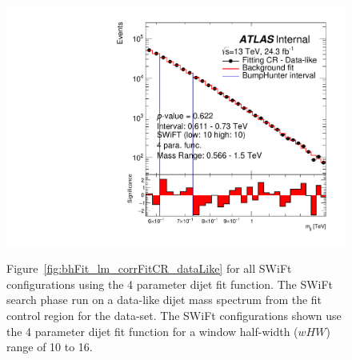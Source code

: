 \begin{figure}[!htb]
{  \includegraphics[width=0.48\linewidth, angle=0]{figs/Dibjet/LowMass/FitStudy_min566/bhFit_corrFitCR_dataLike_v13_4para_low10_high10.pdf}
}
\caption[Figure~\ref{fig:bhFit_lm_corrFitCR_dataLike} for all SWiFt configurations using the 4 parameter dijet fit function.]
{\label{fig:app-bhFit_lm_corrFitCR_dataLike_4para}
  Figure~\ref{fig:bhFit_lm_corrFitCR_dataLike} for all SWiFt configurations using the 4 parameter dijet fit function.
  The SWiFt search phase run on a data-like dijet mass spectrum
  from the fit control region for the \lm{} data-set.
  The SWiFt configurations shown use the 4 parameter dijet fit function for a window half-width ($wHW$) range of 10 to 16.
}
\end{figure}
